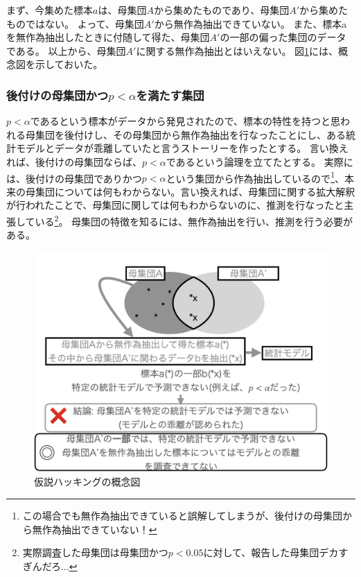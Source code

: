 まず、今集めた標本$a$は、母集団$A$から集めたものであり、母集団$A'$から集めたものではない。
よって、母集団$A'$から無作為抽出できていない。
また、標本aを無作為抽出したときに付随して得た、母集団$A'$の一部の偏った集団のデータである。
以上から、母集団$A'$に関する無作為抽出とはいえない。
図\ref{fig:conceptual_diagram_HARKing}には、概念図を示しておいた。

\subsubsection{後付けの母集団かつ$p<\alpha$を満たす集団}
$p<\alpha$であるという標本がデータから発見されたので、標本の特性を持つと思われる母集団を後付けし、その母集団から無作為抽出を行なったことにし、ある統計モデルとデータが乖離していたと言うストーリーを作ったとする。
言い換えれば、後付けの母集団ならば、$p<\alpha$であるという論理を立てたとする。
実際には、後付けの母集団でありかつ$p<\alpha$という集団から作為抽出しているので\footnote{この場合でも無作為抽出できていると誤解してしまうが、後付けの母集団から無作為抽出できていない！}、本来の母集団については何もわからない。言い換えれば、母集団に関する拡大解釈が行われたことで、母集団に関しては何もわからないのに、推測を行なったと主張している\footnote{実際調査した母集団は母集団かつ$p<0.05$に対して、報告した母集団デカすぎんだろ...}。
母集団の特徴を知るには、無作為抽出を行い、推測を行う必要がある。

\begin{figure}
    \begin{center}
        \includegraphics[width=15cm]{./image/01_/conceptual_diagram/conceptual_diagram.005.png}
        \caption{仮説ハッキングの概念図}
        \label{fig:conceptual_diagram_HARKing}
    \end{center}
\end{figure}
    

